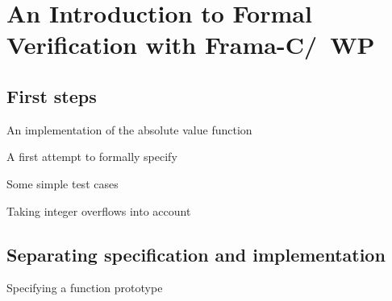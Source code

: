 
\section{An Introduction to Formal Verification with Frama-C\slash\ WP}
\label{sec:frama-c}


\subsection{First steps}

\begin{listing}[hbt]
\begin{minipage}{\textwidth}

\end{minipage}
\caption{\label{fig:abs} An implementation of the absolute value function}
\end{listing}

\begin{listing}[hbt]
\begin{minipage}{\textwidth}

\end{minipage}
\caption{\label{fig:abs1} A first attempt to formally specify }
\end{listing}

\begin{listing}[hbt]
\begin{minipage}{\textwidth}

\end{minipage}
\caption{\label{fig:test_abs} Some simple test cases}
\end{listing}

\begin{listing}[hbt]
\begin{minipage}{\textwidth}

\end{minipage}
\caption{\label{fig:abs1a} Taking integer overflows into account}
\end{listing}

\FloatBarrier

\subsection{Separating specification and implementation}

\begin{listing}[hbt]
\begin{minipage}{\textwidth}

\end{minipage}
\caption{\label{fig:abs2-h} Specifying a function prototype}
\end{listing}


